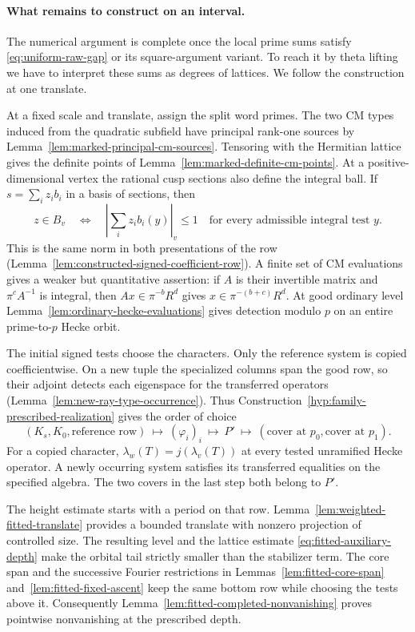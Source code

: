 \paragraph{What remains to construct on an interval.}\label{par:arithmetic-construction-inputs}
The numerical argument is complete once the local prime sums satisfy
\eqref{eq:uniform-raw-gap} or its square-argument variant. To reach it by
theta lifting we have to interpret these sums as degrees of lattices.
We follow the construction at one translate.

At a fixed scale and translate, assign the split word primes. The two CM types induced from the quadratic subfield have principal rank-one sources by Lemma~\ref{lem:marked-principal-cm-sources}. Tensoring with the Hermitian lattice gives the definite points of Lemma~\ref{lem:marked-definite-cm-points}. At a positive-dimensional vertex the rational cusp sections also define the integral ball. If \(s=\sum_i z_i b_i\) in a basis of sections, then
\[
    z\in B_v\quad\Longleftrightarrow\quad
    \left|\sum_i z_i b_i(y)\right|_v\le1
           \quad\text{for every admissible integral test }y .
\]
This is the same norm in both presentations of the row (Lemma~\ref{lem:constructed-signed-coefficient-row}). A finite set of CM evaluations gives a weaker but quantitative assertion: if \(A\) is their invertible matrix and \(\pi^c A^{-1}\) is integral, then \(Ax\in\pi^{-b}R^d\) gives \(x\in\pi^{-(b+c)}R^d\). At good ordinary level Lemma~\ref{lem:ordinary-hecke-evaluations} gives detection modulo \(p\) on an entire prime-to-\(p\) Hecke orbit.

The initial signed tests choose the characters. Only the reference system is copied coefficientwise. On a new tuple the specialized columns span the good row, so their adjoint detects each eigenspace for the transferred operators (Lemma~\ref{lem:new-ray-type-occurrence}). Thus Construction~\ref{hyp:family-prescribed-realization} gives the order of choice
\[
 (K_s,K_0,\text{reference row})\ \longmapsto\ (\varphi_i)_i
     \ \longmapsto\ P'\ \longmapsto\
        (\text{cover at }p_0,\text{cover at }p_1).
\]
For a copied character, \(\lambda_w(T)=j(\lambda_v(T))\) at every tested unramified Hecke operator. A newly occurring system satisfies its transferred equalities on the specified algebra. The two covers in the last step both belong to \(P'\).

The height estimate starts with a period on that row.
Lemma~\ref{lem:weighted-fitted-translate} provides a bounded translate
with nonzero projection of controlled size. The resulting level and
the lattice estimate \eqref{eq:fitted-auxiliary-depth} make the orbital
tail strictly smaller than the stabilizer term. The core span and the
successive Fourier restrictions in Lemmas~\ref{lem:fitted-core-span}
and~\ref{lem:fitted-fixed-ascent} keep the same bottom row while choosing
the tests above it. Consequently Lemma~\ref{lem:fitted-completed-nonvanishing}
proves pointwise nonvanishing at the prescribed depth.

